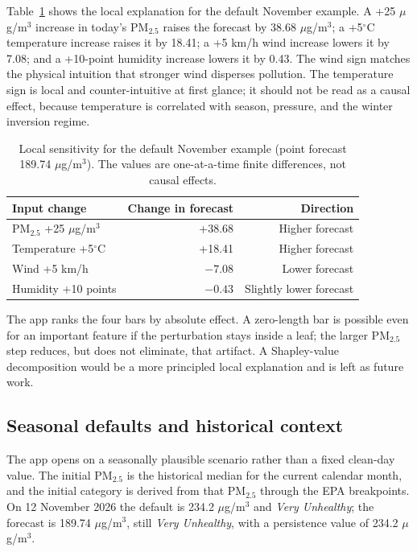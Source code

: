 Table~\ref{tab:local} shows the local explanation for the default November
example. A +25 $\mu$g/m$^3$ increase in today's PM$_{2.5}$ raises the forecast by
38.68 $\mu$g/m$^3$; a +5$^\circ$C temperature increase raises it by 18.41; a
+5 km/h wind increase lowers it by 7.08; and a +10-point humidity increase
lowers it by 0.43. The wind sign matches the physical intuition that stronger
wind disperses pollution. The temperature sign is local and counter-intuitive
at first glance; it should not be read as a causal effect, because temperature
is correlated with season, pressure, and the winter inversion regime.

\begin{table}[htbp]
\centering
\small
\begin{tabular}{@{}lrr@{}}
\toprule
\textbf{Input change} & \textbf{Change in forecast} & \textbf{Direction} \\
\midrule
PM$_{2.5}$ +25 $\mu$g/m$^3$ & +38.68 & Higher forecast \\
Temperature +5$^\circ$C & +18.41 & Higher forecast \\
Wind +5 km/h & $-7.08$ & Lower forecast \\
Humidity +10 points & $-0.43$ & Slightly lower forecast \\
\bottomrule
\end{tabular}
\caption{Local sensitivity for the default November example (point forecast
189.74 $\mu$g/m$^3$). The values are one-at-a-time finite differences, not
causal effects.}
\label{tab:local}
\end{table}

The app ranks the four bars by absolute effect. A zero-length bar is possible
even for an important feature if the perturbation stays inside a leaf; the
larger PM$_{2.5}$ step reduces, but does not eliminate, that artifact. A
Shapley-value decomposition would be a more principled local explanation and is
left as future work.

\subsection{Seasonal defaults and historical context}
\label{sec:d3-seasonal}

The app opens on a seasonally plausible scenario rather than a fixed clean-day
value. The initial PM$_{2.5}$ is the historical median for the current calendar
month, and the initial category is derived from that PM$_{2.5}$ through the EPA
breakpoints. On 12 November 2026 the default is 234.2 $\mu$g/m$^3$ and
\emph{Very Unhealthy}; the forecast is 189.74 $\mu$g/m$^3$, still
\emph{Very Unhealthy}, with a persistence value of 234.2 $\mu$g/m$^3$.

